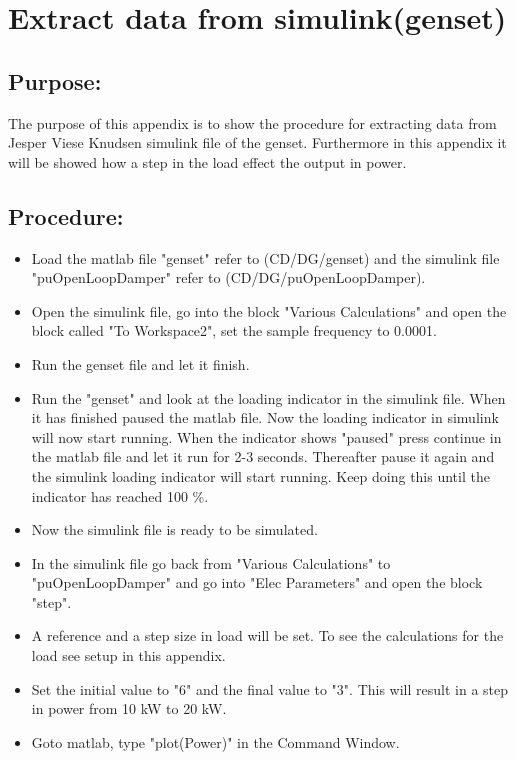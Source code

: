 \section{Extract data from simulink(genset)}
\label{extract_data_from_simulink}
\subsection*{Purpose:}
The purpose of this appendix is to show the procedure for extracting data from Jesper Viese Knudsen simulink file of the genset. Furthermore in this appendix it will be showed how a step in the load effect the output in power.  

\subsection*{Procedure:}

\begin{itemize}
	\item Load the matlab file "genset" refer to (CD/DG/genset) and the simulink file "puOpenLoopDamper" refer to (CD/DG/puOpenLoopDamper).
	\item Open the simulink file, go into the block "Various Calculations" and open the block called "To Workspace2", set the sample frequency to 0.0001.
	\item Run the genset file and let it finish.
	\item Run the "genset" and look at the loading indicator in the simulink file. When it has finished paused the matlab file. Now the loading indicator in simulink will now start running. When the indicator shows "paused" press continue in the matlab file and let it run for 2-3 seconds. Thereafter pause it again and the simulink loading indicator will start running. Keep doing this until the indicator has reached 100 \%. 
	\item Now the simulink file is ready to be simulated. 
	\item In the simulink file go back from "Various Calculations" to "puOpenLoopDamper" and go into "Elec Parameters" and open the block "step".
	\item A reference and a step size in load will be set. To see the calculations for the load see setup in this appendix. 
	\item Set the initial value to "6" and the final value to "3". This will result in a step in power from 10 kW to 20 kW.
	\item Goto matlab, type "plot(Power)" in the Command Window. 

\end{itemize}

